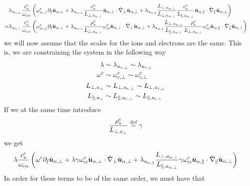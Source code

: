 %
\begin{align*}
    &
 \lambda_{u_{\alpha,\perp}}
 \frac{c^c_s}{\omega_{c\alpha}}
 \left(
 \omega^c_{\alpha,\perp}
 \partial_{\breve{t}} \breve{\boldsymbol{u}}_{\alpha,\perp}
 +
 \lambda_{u_{\alpha,\perp}}
 \frac{ c^c_s }{L_{\perp, u_{\alpha,\perp}}}
 \breve{\boldsymbol{u}}_{\alpha,\perp}\cdot\breve{\nabla}_\perp\breve{\boldsymbol{u}}_{\alpha,\perp}
 +
 \lambda_{u_{\alpha,\|}}
 \frac{L_{\perp, u_{\alpha,\perp}}}{L_{\perp, u_{\alpha,\perp}}}
 \frac{c^c_s}{L_{\|, u_{\alpha,\perp}}}
 \breve{\boldsymbol{u}}_{\alpha,\|}\cdot\breve{\nabla}_\|\breve{\boldsymbol{u}}_{\alpha,\perp}
 \right)
 \\
 =&
 \lambda_{u_{\alpha,\perp}}
 \frac{c^c_s}{\omega_{c\alpha}}
 \left(
 \omega^c_{\alpha,\perp}
 \partial_{\breve{t}} \breve{\boldsymbol{u}}_{\alpha,\perp}
 +
 \lambda_{u_{\alpha,\perp}}
 \frac{ \rho^c_s }{L_{\perp, u_{\alpha,\perp}}}
 \omega^c_{ci}
 \breve{\boldsymbol{u}}_{\alpha,\perp}\cdot\breve{\nabla}_\perp\breve{\boldsymbol{u}}_{\alpha,\perp}
 +
 \lambda_{u_{\alpha,\|}}
 \frac{L_{\perp, u_{\alpha,\perp}}}{L_{\|, u_{\alpha,\perp}}}
 \frac{\rho^c_s}{L_{\perp, u_{\alpha,\perp}}}
 \omega^c_{ci}
 \breve{\boldsymbol{u}}_{\alpha,\|}\cdot\breve{\nabla}_\|\breve{\boldsymbol{u}}_{\alpha,\perp}
 \right)
\end{align*}
%
we will now assume that the scales for the ions and electrons are the same.
This is, we are constraining the system in the following way
%
\begin{align*}
    \lambda              &\sim \lambda_{u_{e,\perp}}  \sim \lambda_{u_{i,\perp}} \\
    \omega^c                &\sim \omega^c_{e,\perp}        \sim \omega^c_{i,\perp}       \\
    L_{\perp, u_{\perp}} &\sim L_{\perp, u_{e,\perp}} \sim L_{\perp, u_{i,\perp}}\\
    L_{\|, u_{\perp}}    &\sim L_{\|, u_{e,\perp}}    \sim L_{\|, u_{i,\perp}}
\end{align*}
%
If we at the same time introduce
%
\begin{align*}
    \frac{ \rho^c_s }{L_{\perp, u_{\perp}}} \overset{\text{def}}{=} \gamma
\end{align*}
%
we get
%
\begin{align}
 \lambda
 \frac{c^c_s}{\omega_{c\alpha}}
 \left(
 \omega^c
 \partial_{\breve{t}} \breve{\boldsymbol{u}}_{\alpha,\perp}
 +
 \lambda
 \gamma
 \omega^c_{ci}
 \breve{\boldsymbol{u}}_{\alpha,\perp}\cdot\breve{\nabla}_\perp\breve{\boldsymbol{u}}_{\alpha,\perp}
 +
 \lambda_{u_{\alpha,\|}}
 \frac{L_{\perp, u_{\alpha,\perp}}}{L_{\|, u_{\alpha,\perp}}}
 \gamma
 \omega^c_{ci}
 \breve{\boldsymbol{u}}_{\alpha,\|}\cdot\breve{\nabla}_\|\breve{\boldsymbol{u}}_{\alpha,\perp}
 \right)
 \label{eq:doLHSAfterFirstConstraint}
\end{align}
%
In order for these terms to  be of the same order, we must have that
